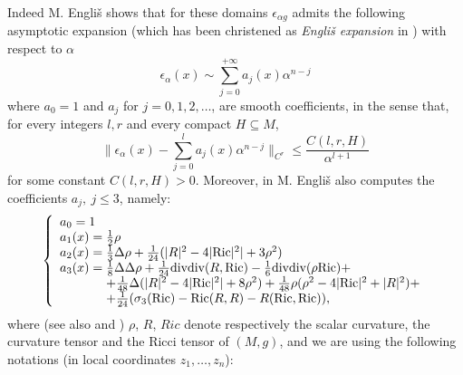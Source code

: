 \documentclass[11pt, reqno]{amsart}
\begin{document}
Indeed M. Engli\v{s} \cite{englis2}
shows that for these domains
$\epsilon_{\alpha g}$ admits the following  asymptotic expansion (which has been  christened  as {\em Engli\v{s} expansion} in \cite{engexp})
with respect to $\alpha$
\begin{equation}\label{Talpha}
\epsilon_{\alpha}(x) \sim
\sum_{j=0}^{+\infty} a_j(x){\alpha}^{n-j}
\end{equation}
where $a_0=1$ and $a_j$ for $j=0,1, 2,\ldots$, are smooth coefficients, in the sense that, for every integers $l, r$ and every compact $H \subseteq M$,
\begin{equation}\label{TalphaMEANS}
\| \epsilon_{\alpha}(x) -
\sum_{j=0}^l  a_j(x){\alpha}^{n-j} \|_{C^r} \leq \frac{C(l, r, H)}{\alpha^{l+1}}
\end{equation}
for some constant $C(l, r, H) >0$.
 Moreover, in
\cite{me2}  M. Engli\v{s} also   computes  the coefficients $a_j,\ j\leq
3$, namely:
\begin{equation}\label{coefflu}
\left\{\begin{array}
{l}
a_0=1\\
a_1(x)=\frac{1}{2}\rho\\
a_2(x)=\frac{1}{3}\Delta\rho
+\frac{1}{24}(|R|^2-4|{\mathrm{Ric}} |^2|+3\rho ^2)\\
a_3(x)=\frac{1}{8}\Delta\Delta\rho +
\frac{1}{24}{\mathop{\hbox{div}}}{\mathop{\hbox{div}}} (R, {\mathrm{Ric}})-
\frac{1}{6}{\mathop{\hbox{div}}}{\mathop{\hbox{div}}} (\rho{\mathrm{Ric}})+\\
\qquad\quad\ \ +\frac{1}{48}\Delta (|R|^2-4|{\mathrm{Ric}} |^2|+8\rho ^2)+
\frac{1}{48}\rho(\rho ^2- 4|{\mathrm{Ric}} |^2+ |R|^2)+\\
\qquad\quad\ \ +\frac{1}{24}(\sigma_3 ({\mathrm{Ric}})- {\mathrm{Ric}} (R, R)-R({\mathrm{Ric}} ,{\mathrm{Ric}})),
\end{array}\right.
\end{equation}
where
\noindent (see also \cite{loismooth} and \cite{lutian})
$\rho$, $R$, $Ric$ denote respectively the scalar curvature,
the curvature tensor and the Ricci tensor of $(M, g)$,
and we are using  the following notations (in local coordinates $z_1, \dots , z_n$):
\end{document}
